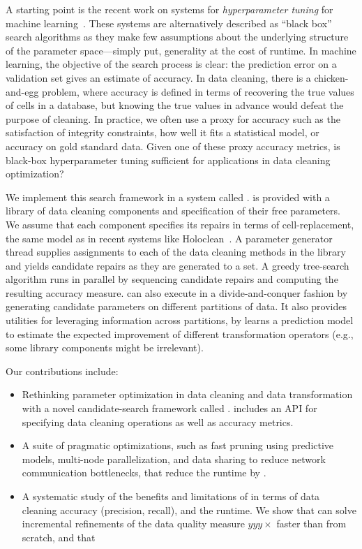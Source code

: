 A starting point is the recent work on systems for \emph{hyperparameter tuning} for machine learning~\cite{li2017hyperband, sparks2017keystoneml, baylor2017tfx, golovin2017google, liaw2018tune}.
These systems are alternatively described as ``black box'' search algorithms as they make few assumptions about the underlying structure of the parameter space---simply put, generality at the cost of runtime.
In machine learning, the objective of the search process is clear: the prediction error on a validation set gives an estimate of accuracy. 
In data cleaning, there is a chicken-and-egg problem, where accuracy is defined in terms of recovering the true values of cells in a database, but knowing the true values in advance would defeat the purpose of cleaning.
In practice, we often use a proxy for accuracy such as the satisfaction of integrity constraints, how well it fits a statistical model, or accuracy on gold standard data.
Given one of these proxy accuracy metrics, is black-box hyperparameter tuning sufficient for applications in data cleaning optimization?

We implement this search framework in a system called \sys.
\sys is provided with a library of data cleaning components and specification of their free parameters. 
We assume that each component specifies its repairs in terms of cell-replacement, the same model as in recent systems like Holoclean~\cite{rekatsinas2017holoclean}.
A parameter generator thread supplies assignments to each of the data cleaning methods in the library and yields candidate repairs as they are generated to a set.
A greedy tree-search algorithm runs in parallel by sequencing candidate repairs and computing the resulting accuracy measure.
\sys can also execute in a divide-and-conquer fashion by generating candidate parameters on different partitions of data.
It also provides utilities for leveraging information across partitions, by learns a prediction model to estimate the expected improvement of different transformation operators (e.g., some library components might be irrelevant).  

\noindent Our contributions include:
\begin{itemize}[leftmargin=*, topsep=0mm, itemsep=0mm]
  \item Rethinking parameter optimization in data cleaning and data transformation with a novel candidate-search framework called \sys. \sys includes an API for specifying data cleaning operations as well as accuracy metrics.
  \item A suite of pragmatic optimizations, such as fast pruning using predictive models, multi-node parallelization, and data sharing to reduce network communication bottlenecks, that reduce the runtime by .
  \item A systematic study of the benefits and limitations of \sys in terms of data cleaning accuracy (precision, recall), and the runtime.  We show that \sys can solve incremental refinements of the data quality measure $yyy\times$ faster than from scratch, and that 
\end{itemize}


